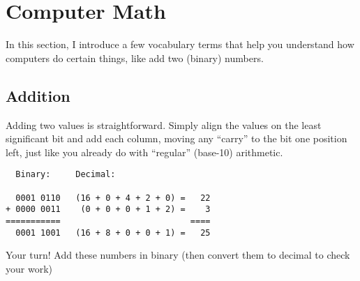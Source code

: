 \section{Computer Math}

In this section, I introduce a few vocabulary terms that help you understand how computers do certain things, like add two (binary) numbers.

\subsection*{Addition}

Adding two values is straightforward. Simply align the values on the least significant bit and add each column, moving any ``carry'' to the bit one position left, just like you already do with ``regular'' (base-10) arithmetic. 

\begin{verbatim}
  Binary:     Decimal:
   
  0001 0110   (16 + 0 + 4 + 2 + 0) =   22
+ 0000 0011    (0 + 0 + 0 + 1 + 2) =    3
===========                          ====
  0001 1001   (16 + 8 + 0 + 0 + 1) =   25
\end{verbatim}


\bigskip

\noindent Your turn! Add these numbers in binary (then convert them to decimal to check your work)

\bigskip


